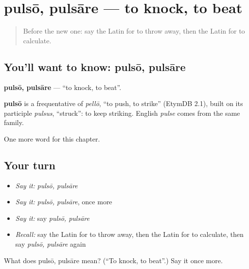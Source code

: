 \section[pulsō, pulsāre]{pulsō, pulsāre — to knock, to beat}

\label{lesson:LA-C167-pulso}



\begin{quote}
Before the new one: say the Latin for to throw away, then the Latin for to calculate.
\end{quote}

\subsection*{You'll want to know: pulsō, pulsāre}
\textbf{pulsō, pulsāre} — \textquotedblleft{}to knock, to beat\textquotedblright{}.

\begin{cousinweb}
\textbf{pulsō} is a frequentative of \emph{pellō}, \textquotedblleft{}to push, to strike\textquotedblright{} (EtymDB 2.1), built on its participle \emph{pulsus}, \textquotedblleft{}struck\textquotedblright{}: to keep striking. English \emph{pulse} comes from the same family.
\end{cousinweb}

\begin{grammarlens}[title={What you've built}]
One more word for this chapter.
\end{grammarlens}

\subsection*{Your turn}
\begin{itemize}
\raggedright
  \item \emph{Say it:} \emph{pulsō, pulsāre}
  \item \emph{Say it:} \emph{pulsō, pulsāre}, once more
  \item \emph{Say it:} say \emph{pulsō, pulsāre}
  \item \emph{Recall:} say the Latin for to throw away, then the Latin for to calculate, then say \emph{pulsō, pulsāre} again
\end{itemize}

\begin{tcolorbox}[breakable,colback=teal!4,colframe=teal!35!black,title={Before you move on}]
What does pulsō, pulsāre mean? (\textquotedblleft{}To knock, to beat\textquotedblright{}.) Say it once more.
\end{tcolorbox}
